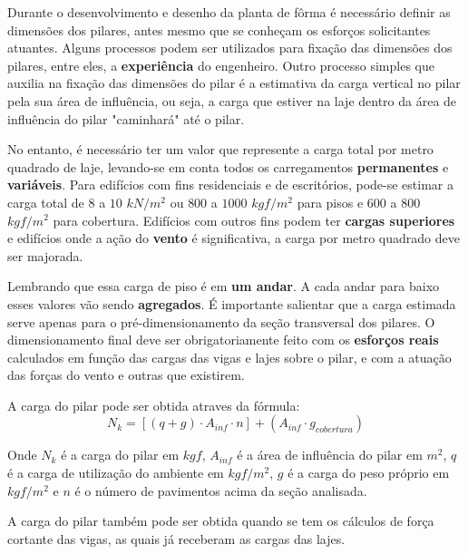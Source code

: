 Durante o desenvolvimento e desenho da planta de fôrma é necessário definir as dimensões dos pilares, antes mesmo que se conheçam os esforços solicitantes atuantes. Alguns processos podem ser utilizados para fixação das dimensões dos pilares, entre eles, a \textbf{experiência} do engenheiro. Outro processo simples que auxilia na fixação das dimensões do pilar é a estimativa da carga vertical no pilar pela sua área de influência, ou seja, a carga que estiver na laje dentro da área de influência do pilar "caminhará" até o pilar.

No entanto, é necessário ter um valor que represente a carga total por metro quadrado de laje, levando-se em conta todos os carregamentos \textbf{permanentes} e \textbf{variáveis}. Para edifícios com fins residenciais e de escritórios, pode-se estimar a carga total de \textbf{$8$} a $10$ $kN/m^2$ ou $800$ a $1000$ $kgf/m^2$ para pisos e $600$ a $800$ $kgf/m^2$ para cobertura. Edifícios com outros fins podem ter \textbf{cargas superiores} e edifícios onde a ação do \textbf{vento} é significativa, a carga por metro quadrado deve ser majorada.

Lembrando que essa carga de piso é em \textbf{um andar}. A cada andar para baixo esses valores vão sendo \textbf{agregados}. É importante salientar que a carga estimada serve apenas para o pré-dimensionamento da seção transversal dos pilares. O dimensionamento final deve ser obrigatoriamente feito com os \textbf{esforços reais} calculados em função das cargas das vigas e lajes sobre o pilar, e com a atuação das forças do vento e outras que existirem.

A carga do pilar pode ser obtida atraves da fórmula:
\begin{equation}N_k=[(q+g)\cdot A_{inf}\cdot n]+(A_{inf}\cdot g_{cobertura})\end{equation}

Onde $N_k$ é a carga do pilar em $kgf$, $A_{inf}$ é a área de influência do pilar em $m^2$, $q$ é a carga de utilização do ambiente em $kgf/m^2$, $g$ é a carga do peso próprio em $kgf/m^2$ e $n$ é o número de pavimentos acima da seção analisada.

A carga do pilar também pode ser obtida quando se tem os cálculos de força cortante das vigas, as quais já receberam as cargas das lajes.